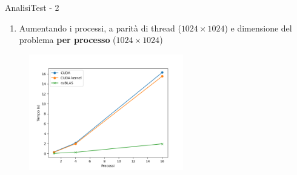 \begin{frame}{Analisi}{Test - 2}
    \begin{enumerate}
        \item[2.] Aumentando i processi, a parità di thread ($1024 \times 1024$) e dimensione del problema \textbf{per processo} ($1024 \times 1024$)
    \end{enumerate}

    \begin{figure}[H]
        \centering
        \includegraphics[width=0.6\textwidth]{./imgs/graphs/caso_b.png}
    \end{figure}
\end{frame}

